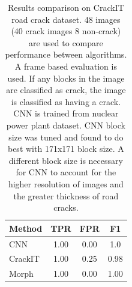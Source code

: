         \begin{table}
        
            \begin{center}
            
                \begin{tabular}{ l c|c|c| }\\
                    \hline
                        \multicolumn{1}{|l||}{\textbf{Method}} & \textbf{TPR} & \textbf{FPR} & \textbf{F1}\\
                    \hline
                        \multicolumn{1}{|p{2cm}||}{CNN} & 1.00 & 0.00 & 1.0 \\
                    \hline
                        \multicolumn{1}{|p{2cm}||}{CrackIT} & 1.00 & 0.25 & 0.98 \\
                    \hline
                        \multicolumn{1}{|p{2cm}||}{Morph} & 1.00 & 0.00 & 1.00 \\
                    \hline
                \end{tabular}
                
                \caption{Results comparison on CrackIT road crack dataset. 48 images (40 crack images 8 non-crack) are used to compare performance between algorithms. A frame based evaluation is used. If any blocks in the image are classified as crack, the image is classified as having a crack. CNN is trained from nuclear power plant dataset. CNN block size was tuned and found to do best with 171x171 block size. A different block size is necessary for CNN to account for the higher resolution of images and the  greater thickness of road cracks.   }
                \label{ResultsComparisonRoad}
            
            \end{center}
            
        \end{table}
        
        
